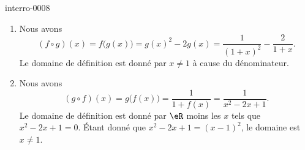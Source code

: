 
\begin{corrige}{interro-0008}

	\begin{enumerate}
		\item
			Nous avons
			\begin{equation}
				(f\circ g)(x)=f\big( g(x) \big)=g(x)^2-2g(x)=\frac{1}{ (1+x)^2 }-\frac{ 2 }{ 1+x }.
			\end{equation}
			Le domaine de définition est donné par $x\neq 1$ à cause du dénominateur.
		\item
			Nous avons
			\begin{equation}
				(g\circ f)(x)=g\big( f(x) \big)=\frac{1}{ 1+f(x) }=\frac{1}{ x^2-2x+1 }.
			\end{equation}
			Le domaine de définition est donné par $\eR$ moins les $x$ tels que $x^2-2x+1=0$. Étant donné que $x^2-2x+1=(x-1)^2$, le domaine est $x\neq 1$.
	\end{enumerate}

\end{corrige}
